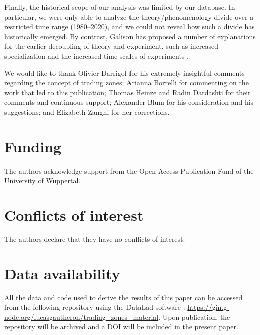 \documentclass[smallextended]{svjour3}
\begin{document}
Finally, the historical scope of our analysis was limited by our database. In particular, we were only able to analyze the theory/phenomenology divide over a restricted time range (1980--2020), and we could not reveal how such a divide has historically emerged. By contrast, Galison has proposed a number of explanations for the earlier decoupling of theory and experiment, such as increased specialization and the increased time-scales of experiments \citep[p.~138]{galison1987how}.

\printglossary[type=\acronymtype,title=List of abbreviations]




\begin{acknowledgements}
We would like to thank Olivier Darrigol for his extremely insightful comments regarding the concept of trading zones; Arianna Borrelli for commenting on the work that led to this publication; Thomas Heinze and  Radin Dardashti for their comments and continuous support; Alexander Blum for his consideration and his suggestions; and Elizabeth Zanghi for her corrections.
\end{acknowledgements}

\section*{Funding}

The authors acknowledge support from the Open Access Publication Fund of the University of Wuppertal.

\section*{Conflicts of interest}

The authors declare that they have no conflicts of interest.

\section*{Data availability}

All the data and code used to derive the results of this paper can be accessed from the following repository using the DataLad software \citep{datalad_paper}: \url{https://gin.g-node.org/lucasgautheron/trading_zones_material}. Upon publication, the repository will be archived and a DOI will be included in the present paper.

% 
\printbibliography
\end{document}
